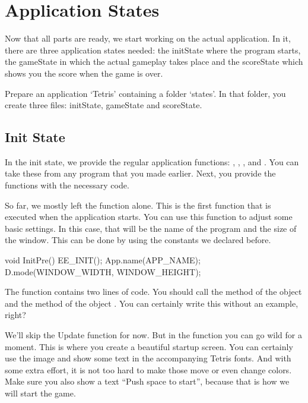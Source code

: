 \chapter{Application States}
Now that all parts are ready, we start working on the actual application. In it, there are three application states needed: the initState where the program starts, the gameState in which the actual gameplay takes place and the scoreState which shows you the score when the game is over.

Prepare an application `Tetris' containing a folder `states'. In that folder, you create three files: initState, gameState and scoreState.

\section{Init State}

In the init state, we provide the regular application functions: , , ,  and . You can take these from any program that you made earlier. Next, you provide the functions with the necessary code.

So far, we mostly left the  function alone. This is the first function that is executed when the application starts. You can use this function to adjust some basic settings. In this case, that will be the name of the program and the size of the window. This can be done by using the constants we declared before.

\begin{code}
void InitPre()
{
   EE_INIT();
   App.name(APP_NAME);
   D.mode(WINDOW_WIDTH, WINDOW_HEIGHT);  
}
\end{code}

The  function contains two lines of code. You should call the  method of the object  and the  method of the object . You can certainly write this without an example, right?

We'll skip the Update function for now. But in the  function you can go wild for a moment. This is where you create a beautiful startup screen. You can certainly use the image and show some text in the accompanying Tetris fonts. And with some extra effort, it is not too hard to make those move or even change colors. Make sure you also show a text ``Push space to start'', because that is how we will start the game.


